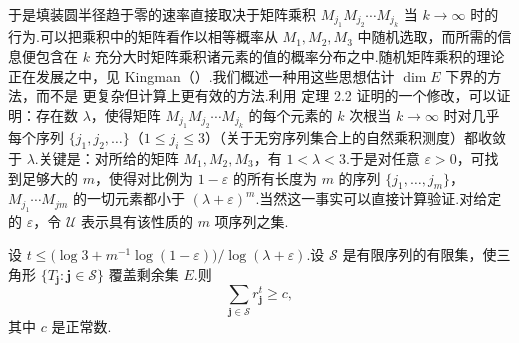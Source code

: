 于是填装圆半径趋于零的速率直接取决于矩阵乘积 $M_{j_1}M_{j_2}\cdots M_{j_k}$ 当 $k\to\infty$ 时的行为.可以把乘积中的矩阵看作以相等概率从 $M_1,M_2,M_3$ 中随机选取，而所需的信息便包含在 $k$ 充分大时矩阵乘积诸元素的值的概率分布之中.随机矩阵乘积的理论正在发展之中，见 Kingman（\citeyear{kingman1973,kingman1976}）.我们概述一种用这些思想估计 $\dim E$ 下界的方法，而不是 \textcite{hirst1967,boyd1973a} 更复杂但计算上更有效的方法.利用 \textcite{kingman1976} 定理 2.2 证明的一个修改，可以证明：存在数 $\lambda$，使得矩阵 $M_{j_1}M_{j_2}\cdots M_{j_k}$ 的每个元素的 $k$ 次根当 $k\to\infty$ 时对几乎每个序列 $\{j_1,j_2,\ldots\}$（$1\leq j_i\leq 3$）（关于无穷序列集合上的自然乘积测度）都收敛于 $\lambda$.关键是：对所给的矩阵 $M_1,M_2,M_3$，有 $1<\lambda<3$.于是对任意 $\varepsilon>0$，可找到足够大的 $m$，使得对比例为 $1-\varepsilon$ 的所有长度为 $m$ 的序列 $\{j_1,\ldots,j_m\}$，$M_{j_1}\cdots M_{jm}$ 的一切元素都小于 $(\lambda+\varepsilon)^m$.当然这一事实可以直接计算验证.对给定的 $\varepsilon$，令 $\mathcal{U}$ 表示具有该性质的 $m$ 项序列之集.

\begin{lemma}\label{lem:8.12}
设 $t\leq\bigl(\log 3+m^{-1}\log(1-\varepsilon)\bigr)/\log(\lambda+\varepsilon)$.设 $\mathcal{S}$ 是有限序列的有限集，使三角形 $\{T_{\mathbf{j}}:\mathbf{j}\in\mathcal{S}\}$ 覆盖剩余集 $E$.则
\begin{equation}\label{eq:8.27}
  \sum_{\mathbf{j}\in\mathcal{S}}r_{\mathbf{j}}^{t}\geq c,
\end{equation}
其中 $c$ 是正常数.
\end{lemma}

